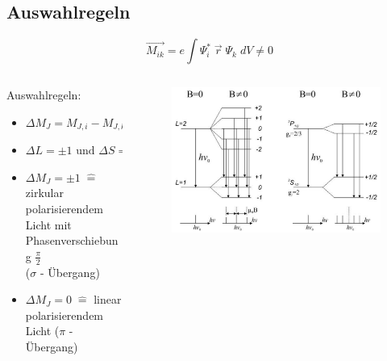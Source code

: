     \subsection{Auswahlregeln}
        \begin{myframe}{\subsecname}
            \begin{equation*}
                \vec{M_{ik}} = e \int \Psi_i^* \; \vec{r} \; \Psi_k \; dV \neq 0
            \end{equation*}
                \begin{columns}
                    \begin{column}{0.48\textwidth}
                    Auswahlregeln:
                        \begin{itemize}
                            \item $\Delta M_J = M_{J,i} - M_{J,k} = 0, \pm 1 $
                            \item $\Delta L = \pm 1 \text{ und } \Delta S = 0 $
                            \item $\Delta M_J = \pm 1 \; \widehat{=}$ zirkular polarisierendem Licht mit Phasenverschiebung $\frac{\pi}{2}$ \\ ($\sigma$ - Übergang)
                            \item $\Delta M_J = 0 \; \widehat{=}$ linear polarisierendem Licht ($\pi$ - Übergang)
                        \end{itemize}
                    \end{column}
                    \begin{column}{0.48\textwidth}
                        \begin{figure}
                            \includegraphics[width=0.8\linewidth]{img/zeemanSplittingScheme.png}

\end{figure}
\end{column}
\end{columns}
\end{myframe}
